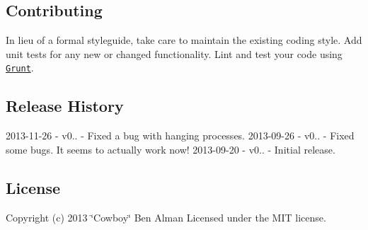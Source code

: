 \subsection*{Contributing}

In lieu of a formal styleguide, take care to maintain the existing coding style. Add unit tests for any new or changed functionality. Lint and test your code using \href{http://gruntjs.com/}{\tt Grunt}.

\subsection*{Release History}

2013-\/11-\/26 -\/ v0.. -\/ Fixed a bug with hanging processes. 2013-\/09-\/26 -\/ v0.. -\/ Fixed some bugs. It seems to actually work now! 2013-\/09-\/20 -\/ v0.. -\/ Initial release.

\subsection*{License}

Copyright (c) 2013 \char`\"{}\+Cowboy\char`\"{} Ben Alman Licensed under the M\+I\+T license. 